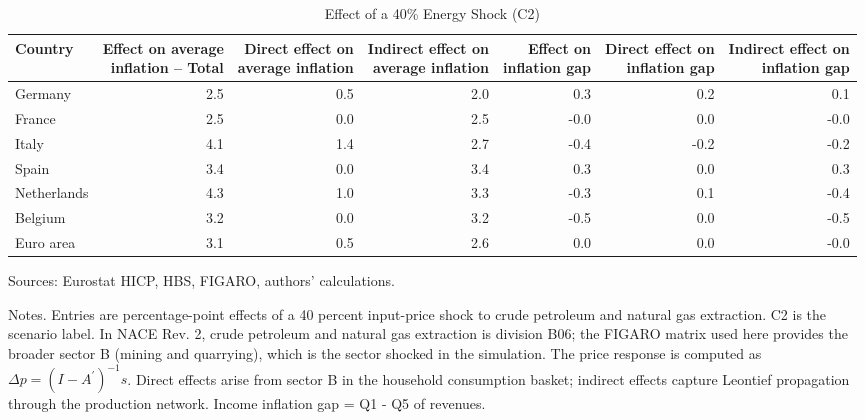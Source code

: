 \begin{table}[H]
\centering
\caption{Effect of a 40\% Energy Shock (C2)}
\scriptsize
\setlength{\tabcolsep}{4.2pt}
\begin{tabular}{lrrrrrr}
\toprule
Country & \shortstack{Effect on average\\inflation -- Total} & \shortstack{Direct effect on\\average inflation} & \shortstack{Indirect effect on\\average inflation} & \shortstack{Effect on\\inflation gap} & \shortstack{Direct effect on\\inflation gap} & \shortstack{Indirect effect on\\inflation gap}
 \\
\midrule
Germany & 2.5 & 0.5 & 2.0 & 0.3 & 0.2 & 0.1
 \\
France & 2.5 & 0.0 & 2.5 & -0.0 & 0.0 & -0.0
 \\
Italy & 4.1 & 1.4 & 2.7 & -0.4 & -0.2 & -0.2
 \\
Spain & 3.4 & 0.0 & 3.4 & 0.3 & 0.0 & 0.3
 \\
Netherlands & 4.3 & 1.0 & 3.3 & -0.3 & 0.1 & -0.4
 \\
Belgium & 3.2 & 0.0 & 3.2 & -0.5 & 0.0 & -0.5
 \\
Euro area & 3.1 & 0.5 & 2.6 & 0.0 & 0.0 & -0.0
 \\
\bottomrule
\end{tabular}
\par\vspace{0.35em}\footnotesize\noindent Sources: Eurostat HICP, HBS, FIGARO, authors' calculations.
\par\vspace{0.25em}\footnotesize\noindent Notes. Entries are percentage-point effects of a 40 percent input-price shock to crude petroleum and natural gas extraction. C2 is the scenario label. In NACE Rev. 2, crude petroleum and natural gas extraction is division B06; the FIGARO matrix used here provides the broader sector B (mining and quarrying), which is the sector shocked in the simulation. The price response is computed as $\Delta p = (I - A^{\prime})^{-1}s$. Direct effects arise from sector B in the household consumption basket; indirect effects capture Leontief propagation through the production network. Income inflation gap = Q1 - Q5 of revenues.
\end{table}
\vspace{0.6em}
